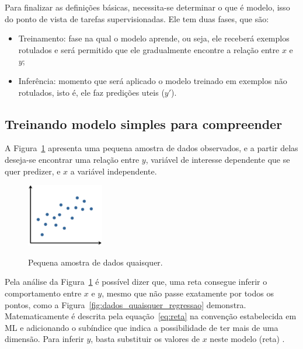             Para finalizar as definições básicas, necessita-se determinar o que é modelo, isso do ponto de vista de tarefas supervisionadas. Ele tem duas fases, que são:
    
            \begin{itemize}
                \item Treinamento: fase na qual o modelo aprende, ou seja, ele receberá exemplos rotulados e será permitido que ele gradualmente encontre a relação entre $x$ e $y$;
                \item Inferência: momento que será aplicado o modelo treinado em exemplos não rotulados, isto é, ele faz predições uteis ($y'$).
            \end{itemize}
    
    
        \subsection{Treinando modelo simples para compreender \am}\label{cap:ML_modelo_qualquer}
            
            A Figura~\ref{fig:dados_quaisquer} apresenta uma pequena amostra de dados observados, e a partir delas deseja-se encontrar uma relação entre $y$, variável de interesse dependente que se quer predizer, e $x$ a variável independente.
            
            \begin{figure}[H]
                \centering
                \caption{Pequena amostra de dados quaisquer.}
                \includegraphics[width=0.3\textwidth]{fig/2-fundamentacao/treinar_modelo_simples/dados_quaisquer.png}
                \label{fig:dados_quaisquer}
            \end{figure}
            
            Pela análise da Figura~\ref{fig:dados_quaisquer} é possível dizer que, uma reta consegue inferir o comportamento entre $x$ e $y$, mesmo que não passe exatamente por todos os pontos, como a Figura~\ref{fig:dados_quaisquer_regressao} demonstra. Matematicamente é descrita pela equação~\ref{eq:reta} na convenção estabelecida em ML e adicionando o subíndice que indica a possibilidade de ter mais de uma dimensão. Para inferir $y$, basta substituir os valores de $x$ neste modelo (reta) \cite{CollegeL30:online}.
            
